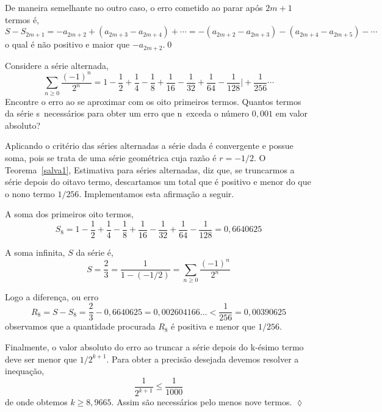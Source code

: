 De maneira semelhante no outro caso, o erro cometido ao parar ap\'{o}s
$2m+1$ termos \'{e},
\begin{equation*}
   S-S_{2m+1}= -a_{2m+2}+(a_{2m+3}-a_{2m+4})+\cdots=-(a_{2m+2}-a_{2m+3})-(a_{2m+4}-a_{2m+5})-\cdots
\end{equation*}
o qual \'{e} n\~{a}o positivo e maior que $-a_{2m+2}$.\qed

\begin{exer}
Considere a s\'{e}rie alternada,
\begin{equation*}
    \sum_{n\geq
    0}\frac{(-1)^n}{2^n}=1-\frac{1}{2}+\frac{1}{4}-\frac{1}{8}+\frac{1}{16}-\frac{1}{32}+\frac{1}{64}
    -\frac{1}{128}\Bigg|+\frac{1}{256}\cdots
\end{equation*}
Encontre o erro ao se aproximar com os oito primeiros termos.
Quantos termos da s\'erie s\ao\ necess\'arios para obter
  um erro que n\ao\ exceda o n\'umero $0,001$ em valor absoluto?
\end{exer}

\sol Aplicando o crit\'{e}rio das s\'{e}ries alternadas a s\'{e}rie dada \'{e}
convergente e possue soma, pois se trata de uma s\'{e}rie geom\'{e}trica
cuja raz\~{a}o \'{e} $r=-1/2$.  O Teorema~\ref{salva1}, Estimativa para
s\'{e}ries alternadas, diz que, se truncarmos a s\'{e}rie depois do oitavo
termo, descartamos um total que \'{e}  positivo e menor do que o nono
termo $1/256$. Implementamos esta afirma\c{c}\~{a}o a seguir.

A soma dos primeiros oito termos,
\begin{equation*}
S_8=1-\frac{1}{2}+\frac{1}{4}-\frac{1}{8}+\frac{1}{16}-\frac{1}{32}+\frac{1}{64}
    -\frac{1}{128}=0,6640625
\end{equation*}

A soma infinita, $S$ da s\'{e}rie \'{e},
\begin{equation*}
    S=\frac{2}{3}=\frac{1}{1-(-1/2)}=\sum_{n\geq
    0}\frac{(-1)^n}{2^n}
\end{equation*}

Logo a diferen\c{c}a, ou erro
\begin{equation*}
    R_8=S-S_8=\frac{2}{3}-0,6640625=0,002604166\ldots<\frac{1}{256}=0,00390625
\end{equation*}
observamos que a quantidade procurada $R_8$ \'{e} positiva e menor que
$1/256$.

Finalmente, o valor absoluto do erro ao truncar a s\'{e}rie depois do
k-\'{e}simo termo deve ser menor que $1/2^{k+1}$. Para obter a precis\~{a}o
desejada devemos resolver a inequa\c{c}\~{a}o,
\begin{equation*}
\frac{1}{2^{k+1}}\leq \frac{1}{1000}
\end{equation*}
de onde obtemos $k\geq 8,9665$. Assim s\~{a}o necess\'{a}rios pelo menos
nove termos. \hfill \(\lozenge\)
